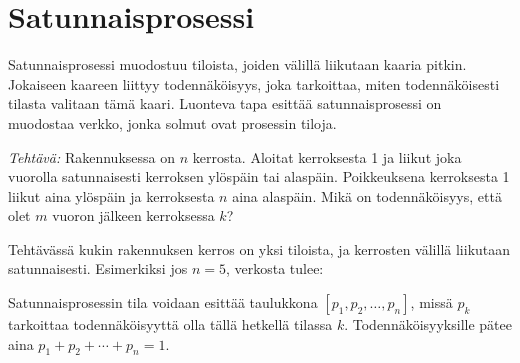 \section{Satunnaisprosessi}

Satunnaisprosessi muodostuu tiloista,
joiden välillä liikutaan kaaria pitkin.
Jokaiseen kaareen liittyy todennäköisyys, joka tarkoittaa,
miten todennäköisesti tilasta valitaan tämä kaari.
Luonteva tapa esittää satunnaisprosessi on
muodostaa verkko, jonka solmut ovat prosessin tiloja.

\textit{Tehtävä:} Rakennuksessa on $n$ kerrosta.
Aloitat kerroksesta 1 ja liikut joka vuorolla
satunnaisesti kerroksen ylöspäin tai alaspäin.
Poikkeuksena kerroksesta 1 liikut aina ylöspäin
ja kerroksesta $n$ aina alaspäin.
Mikä on todennäköisyys, että olet $m$
vuoron jälkeen kerroksessa $k$?

Tehtävässä kukin rakennuksen kerros
on yksi tiloista, ja kerrosten välillä liikutaan
satunnaisesti.
Esimerkiksi jos $n=5$, verkosta tulee:

\begin{center}
\end{center}

Satunnaisprosessin tila voidaan esittää taulukkona
$[p_1,p_2,\ldots,p_n]$, missä $p_k$ tarkoittaa
todennäköisyyttä olla tällä hetkellä tilassa $k$.
Todennäköisyyksille pätee aina $p_1+p_2+\cdots+p_n=1$.

